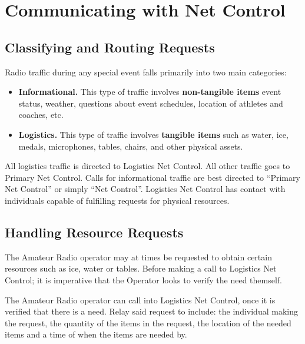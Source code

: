 \documentclass[pdflatex,letterpaper,twoside,12pt]{book}
\begin{document}

\section{Communicating with Net Control}

\subsection{Classifying and Routing Requests}

Radio traffic during any special event falls primarily into two main categories:

\begin{itemize}
	\item \textbf{Informational.}  This type of traffic involves \textbf{non-tangible items} event status, weather, questions about event schedules, location of athletes and coaches, etc.
	\item \textbf{Logistics.}  This type of traffic involves \textbf{tangible items} such as water, ice, medals, microphones, tables, chairs, and other physical assets.  
\end{itemize}

All logistics traffic is directed to Logistics Net Control.  All other traffic goes to Primary Net Control.  Calls for informational traffic are best directed to ``Primary Net Control'' or simply ``Net Control''.  Logistics Net Control has contact with individuals capable of fulfilling requests for physical resources.


\subsection{Handling Resource Requests}

The Amateur Radio operator may at times be requested to obtain certain resources such as ice, water or tables.  Before making a call to Logistics Net Control; it is imperative that the Operator looks to verify the need themself.
 
The Amateur Radio operator can call into Logistics Net Control, once it is verified that there is a need.  Relay said request to include: the individual making the request, the quantity of the items in the request, the location of the needed items and a time of when the items are needed by.
 
\end{document}
